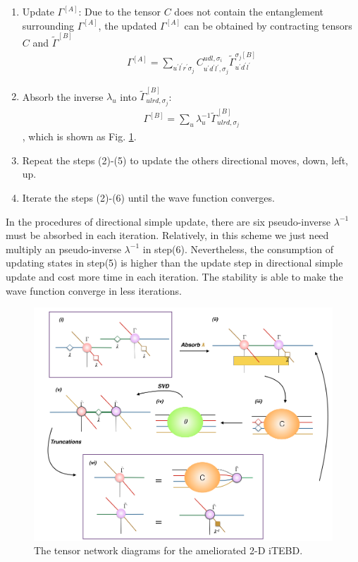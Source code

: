 \begin{enumerate}
		\item Update $\Gamma^{[A]}$: Due to the tensor $C$ does not contain the entanglement surrounding $\Gamma^{[A]}$, the updated $\Gamma^{[A]}$ can be obtained by contracting tensors $C$ and $\widetilde{\Gamma}^{[B]}$
			\begin{align}
				\Gamma^{[A]} = \sum_{u^{\prime}l^{\prime}r^{\prime}\sigma_j}{C^{udl,\sigma_i}_{u^{\prime}d^{\prime}l^{\prime},\sigma_j} \widetilde{\Gamma}^{\sigma_j [B]}_{u^{\prime}d^{\prime}l^{\prime}}}
			\end{align}
		\item Absorb the inverse $\lambda_{u}$ into $\widetilde{\Gamma}^{[B]}_{ulrd,\sigma_j}$:
			\begin{align}
				\Gamma^{[B]} = \sum_{u}{\lambda_{u}^{-1}\widetilde{\Gamma}^{[B]}_{ulrd,\sigma_j}}
			\end{align}
			, which is shown as Fig. \ref{fig318}.
		\item Repeat the steps (2)-(5) to update the others directional moves, down, left, up.  
		\item Iterate the steps (2)-(6) until the wave function converges.
\end{enumerate}

In the procedures of directional simple update, there are six pseudo-inverse $\lambda^{-1}$ must be absorbed in each iteration. Relatively, in this scheme we just need multiply an pseudo-inverse $\lambda^{-1}$ in step(6). Nevertheless, the consumption of updating states in step(5) is higher than the update step in directional simple update and cost more time in each iteration. The stability is able to make the wave function converge in less iterations.

\begin{figure}[ht]
	\centering
	\includegraphics[width=1.00\textwidth]{figures/fig317.png}
	\caption[The tensor network diagrams for the 2-D iTEBD with QR decomposition]{The tensor network diagrams for the ameliorated 2-D iTEBD.}
	\label{fig318}
\end{figure}

